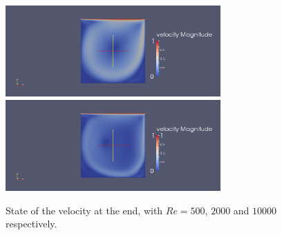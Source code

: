 \documentclass[a4paper]{article}
\begin{document}
\begin{enumerate}
\begin{figure}[hbp!]
\includegraphics[height= 3.5cm]{Reynolds2000_endvelocity.png}\\
\includegraphics[height= 3.5cm]{Reynolds10000_endvelocity.png}
\label{reV}
\caption{State of the velocity at the end, with $Re=500$, $2000$ and $10000$ respectively.}
\end{figure}



\end{enumerate}
\end{document}
